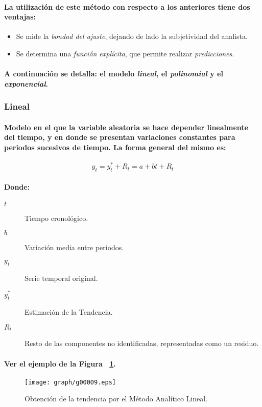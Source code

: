 \paragraph{
La utilización de este método con respecto a los anteriores tiene dos ventajas:
}
\begin{itemize}
\item Se mide la \emph{bondad del ajuste}, dejando de lado la subjetividad del analista.
\item Se determina una \emph{función explícita}, que permite realizar \emph{predicciones}.
\end{itemize}
\paragraph{
A continuación se detalla: el modelo \emph{lineal}, el \emph{polinomial} y el \emph{exponencial}.
}

\subsubsection{Lineal}
\paragraph{
Modelo en el que la variable aleatoria se hace depender linealmente del tiempo, y en donde se presentan variaciones constantes para periodos sucesivos de tiempo. La forma general del mismo es:
}
\begin{equation}
y_t = y_t^* + R_t = a + bt + R_t
\end{equation}
\paragraph{
Donde:
}
\begin{description}
\item[$t$] Tiempo cronológico.
\item[$b$] Variación media entre periodos.
\item[$y_t$] Serie temporal original.
\item[$y_t^*$] Estimación de la Tendencia.
\item[$R_t$] Resto de las componentes no identificadas, representadas como un residuo.
\end{description}
\paragraph{
Ver el ejemplo de la Figura ~\ref{fig:TendenciaMetodoAnaliticoLineal}.
}
\begin{figure}[ht]
\centering
\texttt{[image: graph/g00009.eps]}
\caption[Método Analítico Lineal]{Obtención de la tendencia por el Método Analítico Lineal.}
\label{fig:TendenciaMetodoAnaliticoLineal}
\end{figure}

